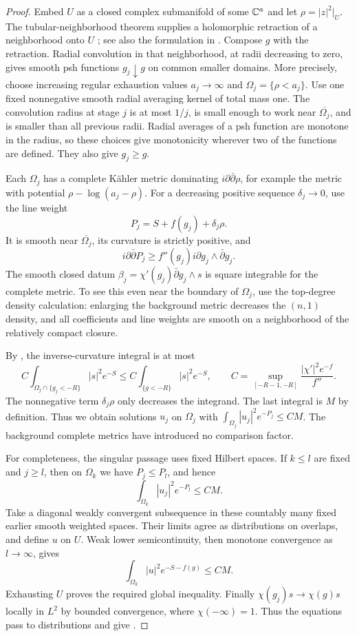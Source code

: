 \begin{proof}
Embed $U$ as a closed complex submanifold of some $\mathbb C^a$ and let
$\rho=|z|^2|_U$.  The tubular-neighborhood theorem supplies a
holomorphic retraction of a neighborhood onto $U$
\cite{DocquierGrauert1960}; see also the formulation in
\cite[Theorem~3.1]{Forstneric2010}.  Compose $g$ with the retraction.
Radial convolution in that neighborhood, at radii decreasing to zero,
gives smooth psh functions $g_j\downarrow g$ on common smaller
domains.  More precisely, choose increasing regular exhaustion values
$a_j\to\infty$ and $\Omega_j=\{\rho<a_j\}$.  Use one fixed nonnegative smooth radial averaging kernel of total mass
one. The convolution radius at stage $j$ is at most $1/j$, is small
enough to work near $\overline{\Omega_j}$, and is smaller than all
previous radii.  Radial
averages of a psh function are monotone in the radius, so these choices
give monotonicity wherever two of the functions are defined.  They
also give $g_j\ge g$.

Each $\Omega_j$ has a complete K\"ahler metric dominating
$i\partial\bar\partial\rho$, for example the metric with potential
$\rho-\log(a_j-\rho)$.  For a decreasing positive sequence
$\delta_j\to0$, use the line weight
\[
 P_j=S+f(g_j)+\delta_j\rho.
\]
It is smooth near $\overline{\Omega_j}$, its curvature is strictly
positive, and
\[
 i\partial\bar\partial P_j
 \ge f''(g_j)i\partial g_j\wedge\bar\partial g_j.
\]
The smooth closed datum
$\beta_j=\chi'(g_j)\bar\partial g_j\wedge s$ is square
integrable for the complete metric.  To see this even near the boundary
of $\Omega_j$, use the top-degree density calculation: enlarging the
background metric decreases the $(n,1)$ density, and all coefficients
and line weights are smooth on a neighborhood of the relatively
compact closure.

By , the inverse-curvature integral is at most
\[
 C\int_{\Omega_j\cap\{g_j<-R\}} |s|^2e^{-S}
 \le C\int_{\{g<-R\}}|s|^2e^{-S},\qquad
 C=\sup_{[-R-1,-R]}\frac{|\chi'|^2e^{-f}}{f''}.
\]
The nonnegative term $\delta_j\rho$ only decreases the integrand.
The last integral is $M$ by definition.
Thus we obtain solutions $u_j$ on $\Omega_j$ with
$\int_{\Omega_j}|u_j|^2e^{-P_j}\le CM$.  The background
complete metrics have introduced no comparison factor.

For completeness, the singular passage uses fixed Hilbert spaces.
If $k\le l$ are fixed and $j\ge l$, then on $\Omega_k$ we have
$P_j\le P_l$, and hence
\[
 \int_{\Omega_k}|u_j|^2e^{-P_l}\le CM.
\]
Take a diagonal weakly convergent subsequence in these countably many
fixed earlier smooth weighted spaces.  Their limits agree as
distributions on overlaps, and define $u$ on $U$.  Weak lower
semicontinuity, then monotone convergence as $l\to\infty$, gives
\[
 \int_{\Omega_k}|u|^2e^{-S-f(g)}\le CM.
\]
Exhausting $U$ proves the required global inequality.  Finally
$\chi(g_j)s\to\chi(g)s$ locally in $L^2$ by bounded convergence,
where $\chi(-\infty)=1$.  Thus the equations pass to distributions
and give .
\end{proof}

